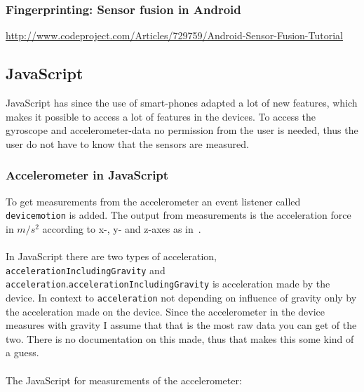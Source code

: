 \subsubsection{Fingerprinting: Sensor fusion in Android}
\url{http://www.codeproject.com/Articles/729759/Android-Sensor-Fusion-Tutorial}

\subsection{JavaScript}\label{subsec:js}
JavaScript has since the use of smart-phones adapted a lot of new features, which makes it possible to access a lot of features in the devices. To access the gyroscope and accelerometer-data no permission from the user is needed, thus the user do not have to know that the sensors are measured.


\subsubsection{Accelerometer in JavaScript}\label{subsec:accJS}
To get measurements from the accelerometer an event listener called \texttt{devicemotion} is added. The output from measurements is the acceleration force in $m/s^2$ according to x-, y- and z-axes as in~. \\
\\
In JavaScript there are two types of acceleration, \texttt{accelerationIncludingGravity} and \texttt{acceleration}.\texttt{accelerationIncludingGravity} is acceleration made by the device. In context to \texttt{acceleration} not depending on influence of gravity only by the acceleration made on the device. Since the accelerometer in the device measures with gravity I assume that that is the most raw data you can get of the two. There is no documentation on this made, thus that makes this some kind of a guess.\\
\\
The JavaScript for measurements of the accelerometer:

\cite[]{sensor:W3C}


